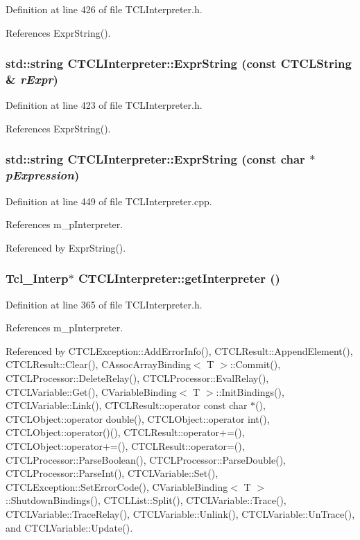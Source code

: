 Definition at line 426 of file TCLInterpreter.h.

References Expr\-String().
\subsubsection{\setlength{\rightskip}{0pt plus 5cm}std::string CTCLInterpreter::Expr\-String (const {\bf CTCLString} \& {\em r\-Expr})\hspace{0.3cm}{\tt  [inline]}}\label{classCTCLInterpreter_a18}




Definition at line 423 of file TCLInterpreter.h.

References Expr\-String().
\subsubsection{\setlength{\rightskip}{0pt plus 5cm}std::string CTCLInterpreter::Expr\-String (const char $\ast$ {\em p\-Expression})}\label{classCTCLInterpreter_a17}




Definition at line 449 of file TCLInterpreter.cpp.

References m\_\-p\-Interpreter.

Referenced by Expr\-String().
\subsubsection{\setlength{\rightskip}{0pt plus 5cm}Tcl\_\-Interp$\ast$ CTCLInterpreter::get\-Interpreter ()\hspace{0.3cm}{\tt  [inline]}}\label{classCTCLInterpreter_a4}




Definition at line 365 of file TCLInterpreter.h.

References m\_\-p\-Interpreter.

Referenced by CTCLException::Add\-Error\-Info(), CTCLResult::Append\-Element(), CTCLResult::Clear(), CAssoc\-Array\-Binding$<$ T $>$::Commit(), CTCLProcessor::Delete\-Relay(), CTCLProcessor::Eval\-Relay(), CTCLVariable::Get(), CVariable\-Binding$<$ T $>$::Init\-Bindings(), CTCLVariable::Link(), CTCLResult::operator const char $\ast$(), CTCLObject::operator double(), CTCLObject::operator int(), CTCLObject::operator()(), CTCLResult::operator+=(), CTCLObject::operator+=(), CTCLResult::operator=(), CTCLProcessor::Parse\-Boolean(), CTCLProcessor::Parse\-Double(), CTCLProcessor::Parse\-Int(), CTCLVariable::Set(), CTCLException::Set\-Error\-Code(), CVariable\-Binding$<$ T $>$::Shutdown\-Bindings(), CTCLList::Split(), CTCLVariable::Trace(), CTCLVariable::Trace\-Relay(), CTCLVariable::Unlink(), CTCLVariable::Un\-Trace(), and CTCLVariable::Update().
